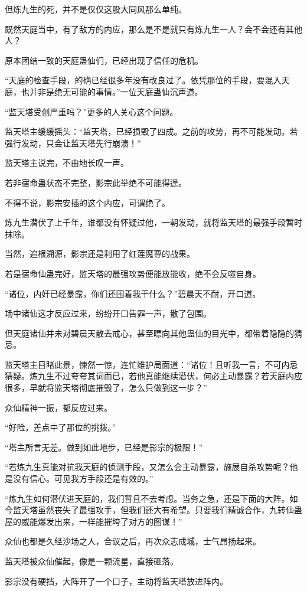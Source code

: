 \begin{this_body}
但炼九生的死，并不是仅仅这股大同风那么单纯。

既然天庭当中，有了敌方的内应，那么是不是就只有炼九生一人？会不会还有其他人？

原本团结一致的天庭蛊仙们，已经出现了信任的危机。

“天庭的检查手段，的确已经很多年没有改良过了。依凭那位的手段，要混入天庭，也并非是绝无可能的事情。”一位天庭蛊仙沉声道。

“监天塔受创严重吗？”更多的人关心这个问题。

监天塔主缓缓摇头：“监天塔，已经损毁了四成。之前的攻势，再不可能发动。若强行发动，只会让监天塔先行崩溃！”

监天塔主说完，不由地长叹一声。

若非宿命蛊状态不完整，影宗此举绝不可能得逞。

不得不说，影宗安插的这个内应，可谓绝了。

炼九生潜伏了上千年，谁都没有怀疑过他，一朝发动，就将监天塔的最强手段暂时抹除。

当然，追根溯源，影宗还是利用了红莲魔尊的战果。

若是宿命仙蛊完好，监天塔的最强攻势便能放能收，绝不会反噬自身。

“诸位，内奸已经暴露，你们还围着我干什么？”碧晨天不耐，开口道。

场中诸仙这才反应过来，纷纷开口告罪一声，散了包围。

但天庭诸仙并未对碧晨天散去戒心，甚至瞟向其他蛊仙的目光中，都带着隐隐的猜忌。

监天塔主目睹此景，悚然一惊，连忙维护局面道：“诸位！且听我一言，不可内忌猜疑。炼九生不过夸夸其词而已，若他真能继续潜伏，何必主动暴露？若天庭内应很多，早就将监天塔彻底摧毁了，怎么只做到这一步？”

众仙精神一振，都反应过来。

“好险，差点中了那位的挑拨。”

“塔主所言无差。做到如此地步，已经是影宗的极限！”

“若炼九生真能对抗我天庭的侦测手段，又怎么会主动暴露，施展自杀攻势呢？他是没有信心。可见我方手段还是有效的。”

“炼九生如何潜伏进天庭的，我们暂且不去考虑。当务之急，还是下面的大阵。如今监天塔虽然丧失了最强攻手，但我们还大有希望。只要我们精诚合作，九转仙蛊屋的威能爆发出来，一样能摧垮了对方的图谋！”

众仙也都是久经沙场之人，合议之后，再次众志成城，士气昂扬起来。

监天塔被众仙催起，像是一颗流星，直接砸落。

影宗没有硬挡，大阵开了一个口子，主动将监天塔放进阵内。


\end{this_body}
